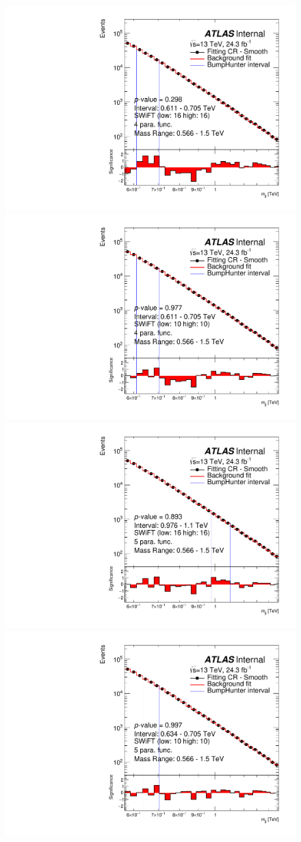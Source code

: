 \begin{figure}[!htb]
\captionsetup[subfigure]{aboveskip=0pt,justification=centering}
\centering
{} {
  \includegraphics[width=0.42\linewidth, angle=0]{figs/Dibjet/LowMass/FitStudy_min566/bhFit_corrFitCR_smooth_4para_low16_high16.pdf}
}
 {
  \includegraphics[width=0.42\linewidth, angle=0]{figs/Dibjet/LowMass/FitStudy_min566/bhFit_corrFitCR_smooth_4para_low10_high10.pdf}
}
 {
  \includegraphics[width=0.42\linewidth, angle=0]{figs/Dibjet/LowMass/FitStudy_min566/bhFit_corrFitCR_smooth_5para_low16_high16.pdf}
}
 {
  \includegraphics[width=0.42\linewidth, angle=0]{figs/Dibjet/LowMass/FitStudy_min566/bhFit_corrFitCR_smooth_5para_low10_high10.pdf}
}


\end{figure}
